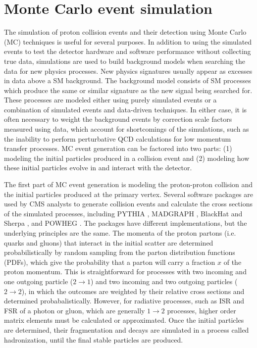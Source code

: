 \section{Monte Carlo event simulation}

The simulation of proton collision events and their detection using Monte Carlo (MC) techniques is useful for several purposes. In addition to using the simulated events to test the detector hardware and software performance without collecting true data, simulations are used to build background models when searching the data for new physics processes. New physics signatures usually appear as excesses in data above a SM background. The background model consists of SM processes which produce the same or similar signature as the new signal being searched for. These processes are modeled either using purely simulated events or a combination of simulated events and data-driven techniques. In either case, it is often necessary to weight the background events by correction scale factors measured using data, which account for shortcomings of the simulations, such as the inability to perform perturbative QCD calculations for low momentum transfer processes. MC event generation can be factored into two parts: (1) modeling the initial particles produced in a collision event and (2) modeling how these initial particles evolve in and interact with the detector.

\indent The first part of MC event generation is modeling the proton-proton collision and the initial particles produced at the primary vertex. Several software packages are used by CMS analysts to generate collision events and calculate the cross sections of the simulated processes, including PYTHIA \cite{1126-6708-2006-05-026}, MADGRAPH \cite{Alwall2011}, BlackHat and Sherpa \cite{Berger:2009ba}, and POWHEG \cite{Alioli:2010ab}. The packages have different implementations, but the underlying principles are the same. The momenta of the proton partons (i.e. quarks and gluons) that interact in the initial scatter are determined probabilistically by random sampling from the parton distribution functions (PDFs), which give the probability that a parton will carry a fraction $x$ of the proton momentum. This is straightforward for processes with two incoming and one outgoing particle ($2 \rightarrow 1$) and two incoming and two outgoing particles ($2 \rightarrow 2$), in which the outcomes are weighted by their relative cross sections and determined probabalistically. However, for radiative processes, such as ISR and FSR of a photon or gluon, which are generally $1 \rightarrow 2$ processes, higher order matrix elements must be calculated or approximated. Once the initial particles are determined, their fragmentation and decays are simulated in a process called hadronization, until the final stable particles are produced. 

